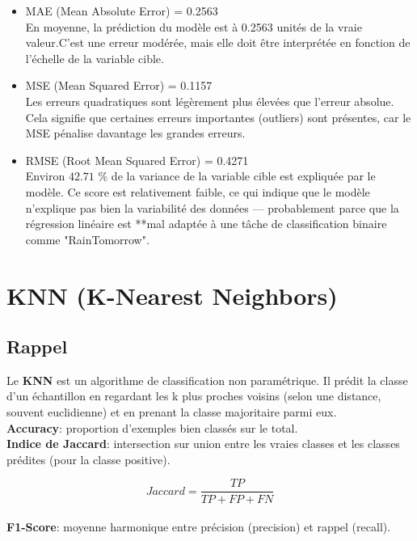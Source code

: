 \documentclass[a4paper,11pt]{article}
\begin{document}
	\begin{itemize}
		\item MAE (Mean Absolute Error) = 0.2563 \\
		En moyenne, la prédiction du modèle est à 0.2563 unités de la vraie valeur.C’est une erreur modérée, mais elle doit être interprétée en fonction de l’échelle de la variable cible.
		\item MSE (Mean Squared Error) = 0.1157\\
		Les erreurs quadratiques sont légèrement plus élevées que l’erreur absolue. Cela signifie que certaines erreurs importantes (outliers) sont présentes, car le MSE pénalise davantage les grandes erreurs.
		\item RMSE (Root Mean Squared Error) = 0.4271 \\
		Environ $42.71$ \% de la variance de la variable cible est expliquée par le modèle.
		Ce score est relativement faible, ce qui indique que le modèle n’explique pas bien la variabilité des données — probablement parce que la régression linéaire est **mal adaptée à une tâche de classification binaire comme "RainTomorrow".		
	\end{itemize}
	
	\newpage
	\vspace{1.5cm}
	\section{KNN (K-Nearest Neighbors)}
	\subsection{Rappel}
	\indent
	
	Le \textbf{KNN} est un algorithme de classification non paramétrique. Il prédit la classe d’un échantillon en regardant les k plus proches voisins (selon une distance, souvent euclidienne) et en prenant la classe majoritaire parmi eux.\\
	
	\indent
	\textbf{Accuracy}: proportion d’exemples bien classés sur le total.\\
	
	\indent
	\textbf{Indice de Jaccard}: intersection sur union entre les vraies classes et les classes prédites (pour la classe positive).
	
	$$
	Jaccard = \frac{TP}{TP + FP + FN}
	$$
	\\
	
	\indent
	\textbf{F1-Score}: moyenne harmonique entre précision (precision) et rappel (recall).
	
\end{document}
